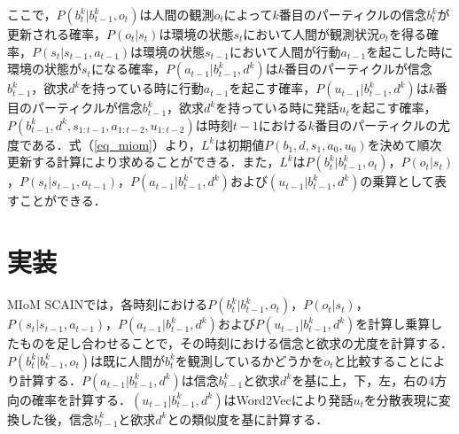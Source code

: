 ここで，$P(b_t^k|b_{t-1}^k,o_t)$は人間の観測$o_t$によって$k$番目のパーティクルの信念$b_t^k$が更新される確率，$P(o_t|s_t)$は環境の状態$s_t$において人間が観測状況$o_t$を得る確率，$P(s_t|s_{t-1},a_{t-1})$は環境の状態$s_{t-1}$において人間が行動$a_{t-1}$を起こした時に環境の状態が$s_{t}$になる確率，$P(a_{t-1}|b_{t-1}^k,d^k)$は$k$番目のパーティクルが信念$b_{t-1}^k$，欲求$d^k$を持っている時に行動$a_{t-1}$を起こす確率，$P(u_{t-1}|b_{t-1}^k,d^k)$は$k$番目のパーティクルが信念$b_{t-1}^k$，欲求$d^k$を持っている時に発話$u_t$を起こす確率，$P(b_{t-1}^k,d^k,s_{1:t-1},a_{1:t-2},u_{1:t-2})$は時刻$t-1$における$k$番目のパーティクルの尤度である．式（\ref{eq_miom}）より，$L^k$は初期値$P(b_1,d,s_1,a_0,u_0)$を決めて順次更新する計算により求めることができる．また，$L^k$は$P(b_t^k|b_{t-1}^k,o_t)$，$P(o_t|s_t)$，$P(s_t|s_{t-1},a_{t-1})$，$P(a_{t-1}|b_{t-1}^k,d^k)$および$(u_{t-1}|b_{t-1}^k,d^k)$の乗算として表すことができる．

\section{実装}
MIoM SCAINでは，各時刻における$P(b_t^k|b_{t-1}^k,o_t)$，$P(o_t|s_t)$，$P(s_t|s_{t-1},a_{t-1})$，$P(a_{t-1}|b_{t-1}^k,d^k)$および$P(u_{t-1}|b_{t-1}^k,d^k)$を計算し乗算したものを足し合わせることで，その時刻における信念と欲求の尤度を計算する．$P(b_t^k|b_{t-1}^k,o_t)$は既に人間が$b_t^k$を観測しているかどうかを$o_t$と比較することにより計算する．$P(a_{t-1}|b_{t-1}^k,d^k)$は信念$b_{t-1}^k$と欲求$d^k$を基に上，下，左，右の4方向の確率を計算する．$(u_{t-1}|b_{t-1}^k,d^k)$はWord2Vec\cite{mikolov2013efficient}により発話$u_t$を分散表現に変換した後，信念$b_{t-1}^k$と欲求$d^k$との類似度を基に計算する．
